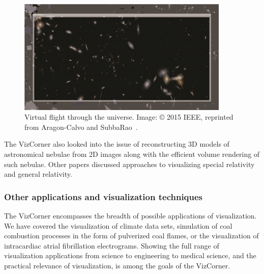 \documentclass[10pt,journal,compsoc]{IEEEtran}
\begin{document}
\begin{figure}
    \begin{center}    
        \includegraphics[width=0.9\textwidth]{galaxies.png}
        \caption{Virtual flight through the universe. 
 Image: \copyright{} 2015 IEEE, reprinted from Aragon-Calvo and SubbaRao~\cite{Aragon-Calvo2015}.
  \label{fig:galaxies}}        
    \end{center}
\end{figure}

The VizCorner also looked into the issue of reconstructing 3D models of astronomical nebulae from 2D images along with the efficient volume rendering of such nebulae. Other papers discussed approaches to visualizing special relativity and general relativity. 


\subsubsection*{Other applications and visualization techniques}

The VizCorner encompasses the breadth of possible applications of visualization. We have covered the visualization of climate data sets, simulation of coal combustion processes in the form of pulverized coal flames, or the visualization of intracardiac atrial fibrillation electrograms. Showing the full range of visualization applications from science to engineering to medical science, and the practical relevance of visualization, is among the goals of the VizCorner. 
\end{document}
